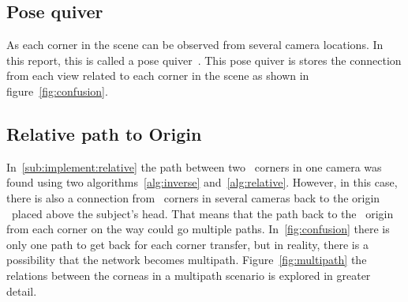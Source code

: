 \subsection{Pose quiver}\label{sub:implement:confusion}
As each \aruco corner in the scene can be observed from several camera locations.
In this report, this is called a pose quiver~\cite{munoz2018mapping}.
This pose quiver is stores the connection from each view related to each corner in the scene as shown in figure~\ref{fig:confusion}.




\subsection{Relative path to Origin}\label{sub:implement:relativepath}
In~\ref{sub:implement:relative} the path between two \aruco\ corners in one camera was found using two algorithms~\ref{alg:inverse} and~\ref{alg:relative}.
However, in this case, there is also a connection from \aruco\ corners in several cameras back to the origin \aruco\ placed above the subject's head.
That means that the path back to the \aruco\ origin from each corner on the way could go multiple paths.
In~\ref{fig:confusion} there is only one path to get back for each corner transfer, but in reality, there is a possibility that the network becomes multipath.
Figure~\ref{fig:multipath} the relations between the corneas in a multipath scenario is explored in greater detail.


